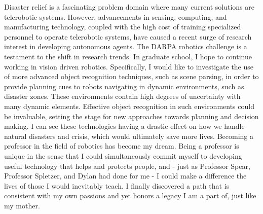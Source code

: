 \documentclass{article}
\begin{document}
Disaster relief is a fascinating problem domain where many current solutions
are telerobotic systems. However, advancements in sensing, computing, and
manufacturing technology, coupled with the high cost of training specialized
personnel to operate telerobotic systems, have caused a recent surge of
research interest in developing autonomous agents. The DARPA robotics challenge
is a testament to the shift in research trends. In graduate school, I hope to
continue working in vision driven robotics.  Specifically, I would like to
investigate the use of more advanced object recognition techniques, such as
scene parsing, in order to provide planning cues to robots navigating in
dynamic environments, such as disaster zones.  These environments contain high
degrees of uncertainty with many dynamic elements. Effective object recognition
in such environments could be invaluable, setting the stage for new approaches
towards planning and decision making. I can see these technologies having a
drastic effect on how we handle natural disasters and crisis, which would
ultimately save more lives. Becoming a professor in the field of robotics has
become my dream. Being a professor is unique in the sense that I could
simultaneously commit myself to developing useful technology that helps and
protects people, and - just as Professor Spear, Professor Spletzer, and Dylan
had done for me - I could make a difference the lives of those I would
inevitably teach. I finally discovered a path that is consistent with my own
passions and yet honors a legacy I am a part of, just like my mother.
\end{document}
